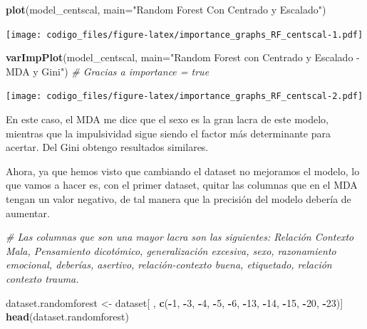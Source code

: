 \documentclass[]{article}
\newenvironment{Shaded}{\begin{snugshade}}{\end{snugshade}}
\newcommand{\KeywordTok}[1]{\textcolor[rgb]{0.13,0.29,0.53}{\textbf{#1}}}
\newcommand{\DataTypeTok}[1]{\textcolor[rgb]{0.13,0.29,0.53}{#1}}
\newcommand{\DecValTok}[1]{\textcolor[rgb]{0.00,0.00,0.81}{#1}}
\newcommand{\StringTok}[1]{\textcolor[rgb]{0.31,0.60,0.02}{#1}}
\newcommand{\CommentTok}[1]{\textcolor[rgb]{0.56,0.35,0.01}{\textit{#1}}}
\newcommand{\OperatorTok}[1]{\textcolor[rgb]{0.81,0.36,0.00}{\textbf{#1}}}
\newcommand{\NormalTok}[1]{#1}
\begin{document}
\begin{Shaded}
\begin{Highlighting}[]
\KeywordTok{plot}\NormalTok{(model_centscal, }\DataTypeTok{main=}\StringTok{"Random Forest Con Centrado y Escalado"}\NormalTok{)}
\end{Highlighting}
\end{Shaded}

\texttt{[image: codigo\_files/figure-latex/importance\_graphs\_RF\_centscal-1.pdf]}

\begin{Shaded}
\begin{Highlighting}[]
\KeywordTok{varImpPlot}\NormalTok{(model_centscal, }\DataTypeTok{main=}\StringTok{"Random Forest con Centrado y Escalado - MDA y Gini"}\NormalTok{) }\CommentTok{# Gracias a importance = true}
\end{Highlighting}
\end{Shaded}

\texttt{[image: codigo\_files/figure-latex/importance\_graphs\_RF\_centscal-2.pdf]}

En este caso, el MDA me dice que el sexo es la gran lacra de este
modelo, mientras que la impulsividad sigue siendo el factor más
determinante para acertar. Del Gini obtengo resultados similares.

Ahora, ya que hemos visto que cambiando el dataset no mejoramos el
modelo, lo que vamos a hacer es, con el primer dataset, quitar las
columnas que en el MDA tengan un valor negativo, de tal manera que la
precisión del modelo debería de aumentar.

\begin{Shaded}
\begin{Highlighting}[]
\CommentTok{# Las columnas que son una mayor lacra son las siguientes: Relación Contexto Mala, Pensamiento dicotómico, generalización excesiva, sexo, razonamiento emocional, deberías, asertivo, relación-contexto buena, etiquetado, relación contexto trauma.}

\NormalTok{dataset.randomforest <-}\StringTok{ }\NormalTok{dataset[ , }\KeywordTok{c}\NormalTok{(}\OperatorTok{-}\DecValTok{1}\NormalTok{, }\OperatorTok{-}\DecValTok{3}\NormalTok{, }\OperatorTok{-}\DecValTok{4}\NormalTok{, }\OperatorTok{-}\DecValTok{5}\NormalTok{, }\OperatorTok{-}\DecValTok{6}\NormalTok{, }\OperatorTok{-}\DecValTok{13}\NormalTok{, }\OperatorTok{-}\DecValTok{14}\NormalTok{, }\OperatorTok{-}\DecValTok{15}\NormalTok{, }\OperatorTok{-}\DecValTok{20}\NormalTok{, }\OperatorTok{-}\DecValTok{23}\NormalTok{)]}
\KeywordTok{head}\NormalTok{(dataset.randomforest)}
\end{Highlighting}
\end{Shaded}
\end{document}
